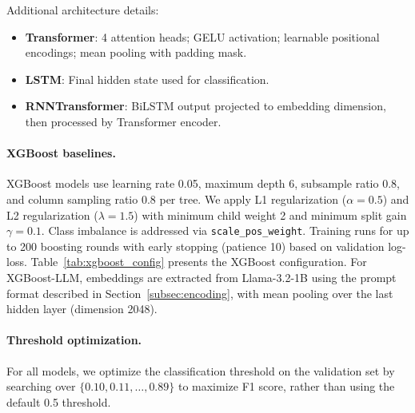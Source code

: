 \documentclass{article} %
\theoremstyle{plain}
\theoremstyle{definition}
\theoremstyle{remark}
\begin{document}
Additional architecture details:
\begin{itemize}
    \item \textbf{Transformer}: 4 attention heads; GELU activation; learnable positional encodings; mean pooling with padding mask.
    \item \textbf{LSTM}: Final hidden state used for classification.
    \item \textbf{RNNTransformer}: BiLSTM output projected to embedding dimension, then processed by Transformer encoder.
\end{itemize}


\paragraph{XGBoost baselines.}
XGBoost models use learning rate 0.05, maximum depth 6, subsample ratio 0.8, and column sampling ratio 0.8 per tree. We apply L1 regularization ($\alpha=0.5$) and L2 regularization ($\lambda=1.5$) with minimum child weight 2 and minimum split gain $\gamma=0.1$. Class imbalance is addressed via \texttt{scale\_pos\_weight}. Training runs for up to 200 boosting rounds with early stopping (patience 10) based on validation log-loss. Table~\ref{tab:xgboost_config} presents the XGBoost configuration. For XGBoost-LLM, embeddings are extracted from Llama-3.2-1B using the prompt format described in Section~\ref{subsec:encoding}, with mean pooling over the last hidden layer (dimension 2048).

\paragraph{Threshold optimization.}
For all models, we optimize the classification threshold on the validation set by searching over $\{0.10, 0.11, \ldots, 0.89\}$ to maximize F1 score, rather than using the default 0.5 threshold.
\end{document}
